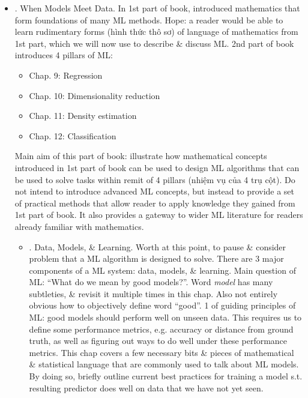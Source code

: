 \documentclass{article}
\begin{document}
\begin{itemize}
	\item {. When Models Meet Data.} In 1st part of book, introduced mathematics that form foundations of many ML methods. Hope: a reader would be able to learn rudimentary forms (hình thức thô sơ) of language of mathematics from 1st part, which we will now use to describe  \& discuss ML. 2nd part of book introduces 4 pillars of ML:
	\begin{itemize}
		\item Chap. 9: Regression
		\item Chap. 10: Dimensionality reduction
		\item Chap. 11: Density estimation
		\item Chap. 12: Classification
	\end{itemize}
	Main aim of this part of book: illustrate how mathematical concepts introduced in 1st part of book can be used to design ML algorithms that can be used to solve tasks within remit of 4 pillars (nhiệm vụ của 4 trụ cột). Do not intend to introduce advanced ML concepts, but instead to provide a set of practical methods that allow reader to apply knowledge they gained from 1st part of book. It also provides a gateway to wider ML literature for readers already familiar with mathematics.
	\begin{itemize}
		\item {. Data, Models, \& Learning.} Worth at this point, to pause \& consider problem that a ML algorithm is designed to solve. There are 3 major components of a ML system: data, models, \& learning. Main question of ML: ``What do we mean by good models?''. Word {\it model} has many subtleties, \& revisit it multiple times in this chap. Also not entirely obvious how to objectively define word ``good''. 1 of guiding principles of ML: good models should perform well on unseen data. This requires us to define some performance metrics, e.g. accuracy or distance from ground truth, as well as figuring out ways to do well under these performance metrics. This chap covers a few necessary bits \& pieces of mathematical \& statistical language that are commonly used to talk about ML models. By doing so, briefly outline current best practices for training a model s.t. resulting predictor does well on data that we have not yet seen.
		

\end{itemize}
\end{itemize}
\end{document}
